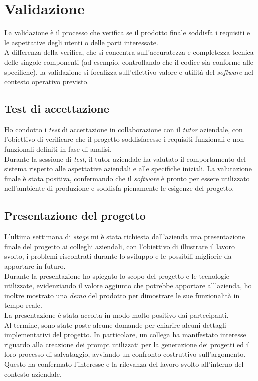 \pagebreak
\section{Validazione}
\label{sez:validazione}

La validazione è il processo che verifica se il prodotto finale soddisfa i requisiti e le aspettative degli utenti o delle parti interessate. \\
A differenza della verifica, che si concentra sull’accuratezza e completezza tecnica delle singole componenti (ad esempio, controllando che il codice sia conforme alle specifiche), la validazione si focalizza sull’effettivo valore e utilità del \textit{software} nel contesto operativo previsto.  \\

\subsection{Test di accettazione}
\label{subsec:test-accettazione}

Ho condotto i \textit{test} di accettazione in collaborazione con il \textit{tutor} aziendale, con l’obiettivo di verificare che il progetto soddisfacesse i requisiti funzionali e non funzionali definiti in fase di analisi.\\

\noindent Durante la sessione di \textit{test}, il tutor aziendale ha valutato il comportamento del sistema rispetto alle aspettative aziendali e alle specifiche iniziali. La valutazione finale è stata positiva, confermando che il \textit{software} è pronto per essere utilizzato nell’ambiente di produzione e soddisfa pienamente le esigenze del progetto.
\subsection{Presentazione del progetto}
\label{subsec:presentazione-progetto}

L'ultima settimana di \textit{stage} mi è stata richiesta dall'azienda una presentazione finale del progetto ai colleghi aziendali, con l'obiettivo di illustrare il lavoro svolto, i problemi riscontrati durante lo sviluppo e le possibili migliorie da apportare in futuro.\\

\noindent Durante la presentazione ho spiegato lo scopo del progetto e le tecnologie utilizzate, evidenziando il valore aggiunto che potrebbe apportare all'azienda, ho inoltre mostrato una \textit{demo} del prodotto per dimostrare le sue funzionalità in tempo reale.\\  

\noindent La presentazione è stata accolta in modo molto positivo dai partecipanti. \\Al termine, sono state poste alcune domande per chiarire alcuni dettagli implementativi del progetto. In particolare, un collega ha manifestato interesse riguardo alla creazione dei \gls{prompt} utilizzati per la generazione dei progetti ed il loro processo di salvataggio, avviando un confronto costruttivo sull’argomento.\\
Questo ha confermato l’interesse e la rilevanza del lavoro svolto all'interno del contesto aziendale.

